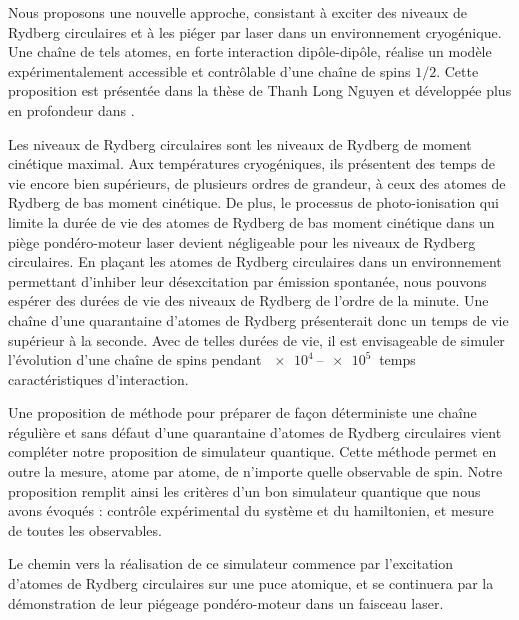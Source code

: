 \bigskip
Nous proposons une nouvelle approche, consistant à exciter des niveaux de Rydberg circulaires et à les piéger par laser dans un environnement cryogénique.
Une chaîne de tels atomes, en forte interaction dipôle-dipôle,  réalise un modèle expérimentalement accessible et contrôlable d'une chaîne de spins $1/2$.
Cette proposition est présentée dans la thèse de Thanh Long Nguyen \cite{PHD_NGUYEN} et développée plus en profondeur dans \cite{ENS_PRE_CIRCSIM}.

Les niveaux de Rydberg circulaires sont les niveaux de Rydberg de moment cinétique maximal.
Aux températures cryogéniques, ils présentent des temps de vie encore bien supérieurs, de plusieurs ordres de grandeur, à ceux des atomes de Rydberg de bas moment cinétique.
De plus, le processus de photo-ionisation qui limite la durée de vie des atomes de Rydberg de bas moment cinétique dans un piège pondéro-moteur laser devient négligeable pour les niveaux de Rydberg circulaires.
En plaçant les atomes de Rydberg circulaires dans un environnement permettant d'inhiber leur désexcitation par émission spontanée, nous pouvons espérer des durées de vie des niveaux de Rydberg de l'ordre de la minute.
Une chaîne d'une quarantaine d'atomes de Rydberg présenterait donc un temps de vie supérieur à la seconde.
Avec de telles durées de vie, il est envisageable de simuler l'évolution d'une chaîne de spins pendant $\SIrange{e4}{e5}{}$ temps caractéristiques d'interaction.

Une proposition de méthode pour préparer de façon déterministe une chaîne régulière et sans défaut d'une quarantaine d'atomes de Rydberg circulaires vient compléter notre proposition de simulateur quantique.
Cette méthode permet en outre la mesure, atome par atome, de n'importe quelle observable de spin.
Notre proposition remplit ainsi les critères d'un bon simulateur quantique que nous avons évoqués : contrôle expérimental du système et du hamiltonien, et mesure de toutes les observables.

Le chemin vers la réalisation de ce simulateur commence par l'excitation d'atomes de Rydberg circulaires sur une puce atomique, et se continuera par la démonstration de leur piégeage pondéro-moteur dans un faisceau laser.

